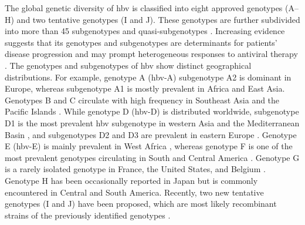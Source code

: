 The global genetic diversity of \gls{hbv} is classified into eight approved genotypes (A--H) and two tentative genotypes (I and J).
These genotypes are further subdivided into more than 45 subgenotypes and quasi-subgenotypes \citep{pourkarim2014molecular,thijssen2020novel}.
Increasing evidence suggests that its genotypes and subgenotypes are determinants for patients' disease progression and may prompt heterogeneous responses to antiviral therapy \citep{mcmahon_influence_2009,croagh_genotypes_2015,shen_hepatitis_2014,pourkarim2014molecular,zhang_rapidly_2020,mina_genomic_2015}.
The genotypes and subgenotypes of \gls{hbv} show distinct geographical distributions.
For example, genotype A (\gls{hbv}-A) subgenotype A2 is dominant in Europe, whereas subgenotype A1 is mostly prevalent in Africa and East Asia.
Genotypes B and C circulate with high frequency in Southeast Asia and the Pacific Islands \citep{norder_genetic_2004}.
While genotype D (\gls{hbv}-D) is distributed worldwide, subgenotype D1 is the most prevalent \gls{hbv} subgenotype in western Asia and the Mediterranean Basin \citep{zehender_spatial_2012,al-qahtani_molecular_2020,trovao_reconstruction_2022}, and subgenotypes D2 and D3 are prevalent in eastern Europe \citep{pourkarim2014molecular,pineda-pena_epidemiological_2015}.
Genotype E (\gls{hbv}-E) is mainly prevalent in West Africa \citep{ingasia_global_2020}, whereas genotype F is one of the most prevalent genotypes circulating in South and Central America \citep{pujol_hepatitis_2020}.
Genotype G is a rarely isolated genotype in France, the United States, and Belgium \citep{kay2007hepatitis,mina_genomic_2015}.
Genotype H has been occasionally reported in Japan but is commonly encountered in Central and South America.
Recently, two new tentative genotypes (I and J) have been proposed, which are most likely recombinant strains of the previously identified genotypes \citep{pourkarim2014molecular}.\\

